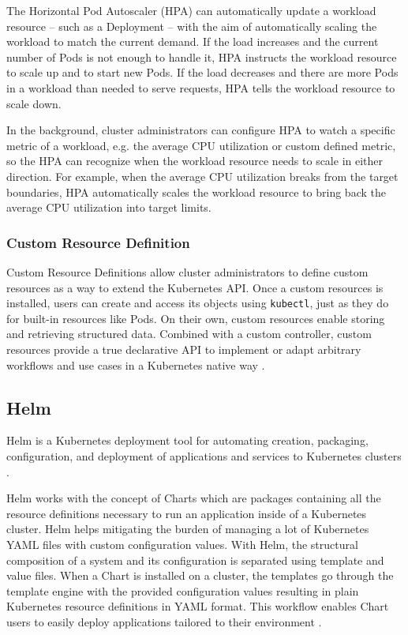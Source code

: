 The Horizontal Pod Autoscaler (HPA) can automatically update a workload resource -- such as a Deployment -- with the aim of automatically scaling the workload to match the current demand. If the load increases and the current number of Pods is not enough to handle it, HPA instructs the workload resource to scale up and to start new Pods. If the load decreases and there are more Pods in a workload than needed to serve requests, HPA tells the workload resource to scale down.

In the background, cluster administrators can configure HPA to watch a specific metric of a workload, e.g. the average CPU utilization or custom defined metric, so the HPA can recognize when the workload resource needs to scale in either direction. For example, when the average CPU utilization breaks from the target boundaries, HPA automatically scales the workload resource to bring back the average CPU utilization into target limits.

\subsubsection{Custom Resource Definition}

Custom Resource Definitions allow cluster administrators to define custom resources as a way to extend the Kubernetes API. Once a custom resources is installed, users can create and access its objects using \texttt{kubectl}, just as they do for built-in resources like Pods. On their own, custom resources enable storing and retrieving structured data. Combined with a custom controller, custom resources provide a true declarative API to implement or adapt arbitrary workflows and use cases in a Kubernetes native way \cite{KubernetesCRD}.

\subsection{Helm} \label{helm}

Helm is a Kubernetes deployment tool for automating creation, packaging, configuration, and deployment of applications and services to Kubernetes clusters \cite{HelmWhatIs}.

Helm works with the concept of Charts which are packages containing all the resource definitions necessary to run an application inside of a Kubernetes cluster. Helm helps mitigating the burden of managing a lot of Kubernetes YAML files with custom configuration values. With Helm, the structural composition of a system and its configuration is separated using template and value files. When a Chart is installed on a cluster, the templates go through the template engine with the provided configuration values resulting in plain Kubernetes resource definitions in YAML format.  This workflow enables Chart users to easily deploy applications tailored to their environment \cite{Helm}.

